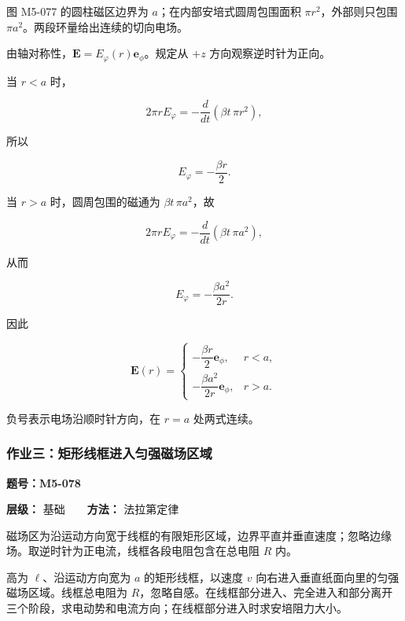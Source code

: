 图 M5-077 的圆柱磁区边界为 \(a\)；在内部安培式圆周包围面积
\(\pi r^2\)，外部则只包围 \(\pi a^2\)。两段环量给出连续的切向电场。

由轴对称性，\(\mathbf E=E_{\varphi}(r)\mathbf e_{\phi}\)。规定从 \(+z\)
方向观察逆时针为正向。

当 \(r<a\) 时，

\[
2\pi rE_{\varphi}
=-\frac d{dt}(\beta t\,\pi r^2),
\]

所以

\[
E_{\varphi}=-\frac{\beta r}{2}.
\]

当 \(r>a\) 时，圆周包围的磁通为 \(\beta t\,\pi a^2\)，故

\[
2\pi rE_{\varphi}
=-\frac d{dt}(\beta t\,\pi a^2),
\]

从而

\[
E_{\varphi}=-\frac{\beta a^2}{2r}.
\]

因此

\[
\boxed{
\mathbf E(r)=
\begin{cases}
-\dfrac{\beta r}{2}\mathbf e_{\phi}, & r<a,\\[6pt]
-\dfrac{\beta a^2}{2r}\mathbf e_{\phi}, & r>a.
\end{cases}
}
\]

负号表示电场沿顺时针方向，在 \(r=a\) 处两式连续。

\par{}
\noindent\begin{minipage}{\linewidth}

\subsubsection{作业三：矩形线框进入匀强磁场区域}\label{m5:ux4f5cux4e1aux4e09ux77e9ux5f62ux7ebfux6846ux8fdbux5165ux5300ux5f3aux78c1ux573aux533aux57df}

\textbf{题号：M5-078}

\textbf{层级：} 基础　　\textbf{方法：} 法拉第定律

磁场区为沿运动方向宽于线框的有限矩形区域，边界平直并垂直速度；忽略边缘场。取逆时针为正电流，线框各段电阻包含在总电阻
\(R\) 内。

高为 \(\ell\)、沿运动方向宽为 \(a\) 的矩形线框，以速度 \(v\)
向右进入垂直纸面向里的匀强磁场区域。线框总电阻为
\(R\)，忽略自感。在线框部分进入、完全进入和部分离开三个阶段，求电动势和电流方向；在线框部分进入时求安培阻力大小。

\end{minipage}\par

